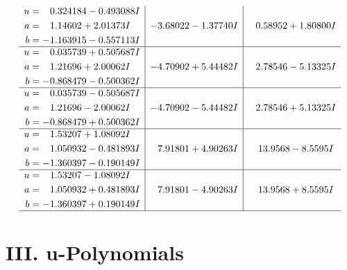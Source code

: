\documentclass[1p]{elsarticle_modified}
\theoremstyle{definition}
\begin{document}
$$\begin{array}{c|c|c}
\begin{aligned}
u &= \phantom{-}0.324184 - 0.493088 I \\
a &= \phantom{-}1.14602 + 2.01373 I \\
b &= -1.163915 - 0.557113 I\end{aligned}
 & -3.68022 - 1.37740 I & \phantom{-}0.58952 + 1.80800 I \\ \hline\begin{aligned}
u &= \phantom{-}0.035739 + 0.505687 I \\
a &= \phantom{-}1.21696 + 2.00062 I \\
b &= -0.868479 - 0.500362 I\end{aligned}
 & -4.70902 + 5.44482 I & \phantom{-}2.78546 - 5.13325 I \\ \hline\begin{aligned}
u &= \phantom{-}0.035739 - 0.505687 I \\
a &= \phantom{-}1.21696 - 2.00062 I \\
b &= -0.868479 + 0.500362 I\end{aligned}
 & -4.70902 - 5.44482 I & \phantom{-}2.78546 + 5.13325 I \\ \hline\begin{aligned}
u &= \phantom{-}1.53207 + 1.08092 I \\
a &= \phantom{-}1.050932 - 0.481893 I \\
b &= -1.360397 - 0.190149 I\end{aligned}
 & \phantom{-}7.91801 + 4.90263 I & \phantom{-}13.9568 - 8.5595 I \\ \hline\begin{aligned}
u &= \phantom{-}1.53207 - 1.08092 I \\
a &= \phantom{-}1.050932 + 0.481893 I \\
b &= -1.360397 + 0.190149 I\end{aligned}
 & \phantom{-}7.91801 - 4.90263 I & \phantom{-}13.9568 + 8.5595 I\\
 \hline 
 \end{array}$$\newpage
\newpage\renewcommand{\arraystretch}{1}
\centering \section*{ III. u-Polynomials}
\end{document}

